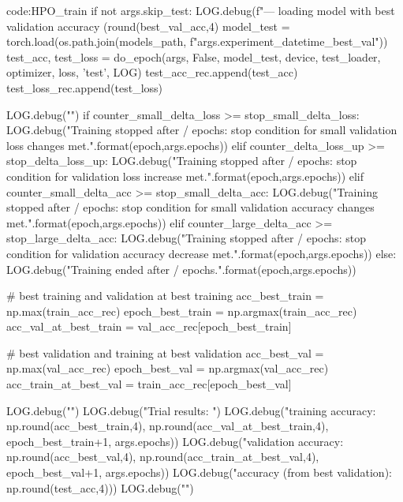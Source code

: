 \begin{mycodebox}{code:HPO_train}
        if not args.skip_test:
            LOG.debug(f"--- loading model with best validation accuracy ({round(best_val_acc,4)}%
            model_test = torch.load(os.path.join(models_path,
                f"{args.experiment_datetime}_best_val"))
            test_acc, test_loss = do_epoch(args, False, model_test, device, test_loader, optimizer, loss, 'test', LOG)
            test_acc_rec.append(test_acc)
            test_loss_rec.append(test_loss)
        
        LOG.debug("\n")
        if counter_small_delta_loss >= stop_small_delta_loss:
            LOG.debug("Training stopped after {}/{} epochs: stop condition for small validation loss changes met.".format(epoch,args.epochs))
        elif counter_delta_loss_up >= stop_delta_loss_up:
            LOG.debug("Training stopped after {}/{} epochs: stop condition for validation loss increase met.".format(epoch,args.epochs))
        elif counter_small_delta_acc >= stop_small_delta_acc:
            LOG.debug("Training stopped after {}/{} epochs: stop condition for small validation accuracy changes met.".format(epoch,args.epochs))
        elif counter_large_delta_acc >= stop_large_delta_acc:
            LOG.debug("Training stopped after {}/{} epochs: stop condition for validation accuracy decrease met.".format(epoch,args.epochs))
        else:
            LOG.debug("Training ended after {}/{} epochs.".format(epoch,args.epochs))
        
        # best training and validation at best training
        acc_best_train = np.max(train_acc_rec)
        epoch_best_train = np.argmax(train_acc_rec)
        acc_val_at_best_train = val_acc_rec[epoch_best_train]

        # best validation and training at best validation
        acc_best_val = np.max(val_acc_rec)
        epoch_best_val = np.argmax(val_acc_rec)
        acc_train_at_best_val = train_acc_rec[epoch_best_val]

        LOG.debug("\n")
        LOG.debug("Trial results: ")
        LOG.debug("\tBest training accuracy: {}%
            np.round(acc_best_train,4), np.round(acc_val_at_best_train,4), epoch_best_train+1, args.epochs))
        LOG.debug("\tBest validation accuracy: {}%
            np.round(acc_best_val,4), np.round(acc_train_at_best_val,4), epoch_best_val+1, args.epochs))
        LOG.debug("\tTest accuracy (from best validation): {}%
            np.round(test_acc,4)))
        LOG.debug("\n")


\end{mycodebox}
